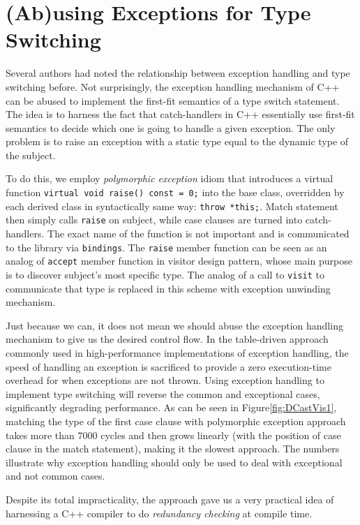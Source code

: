 \documentclass[preprint]{sigplanconf}
\makeatletter
\DeclareRobustCommand{\code}[1]{{\lstinline[breaklines=false,escapechar=@]{#1}}}
\makeatother
\begin{document}
\section{(Ab)using Exceptions for Type Switching}
\label{sec:xpm}

Several authors had noted the relationship between exception handling and type 
switching before\cite{Glew99,ML2000}. Not surprisingly, the exception handling 
mechanism of C++ can be abused to implement the first-fit semantics of a type 
switch statement. The idea is to harness the fact that catch-handlers in C++ 
essentially use first-fit semantics to decide which one is going to handle a 
given exception. The only problem is to raise an exception with a static type 
equal to the dynamic type of the subject.

To do this, we employ \emph{polymorphic exception} idiom\cite{PolyExcept} that 
introduces a virtual function \code{virtual void raise() const = 0;} into the 
base class, overridden by each derived class in syntactically same way: 
\code{throw *this;}. Match statement then simply calls \code{raise} on subject, 
while case clauses are turned into catch-handlers. The exact name of the 
function is not important and is communicated to the library via 
\code{bindings}. The \code{raise} member function can be seen as an analog of 
\code{accept} member function in visitor design pattern, whose main purpose is 
to discover subject's most specific type. The analog of a call to \code{visit} 
to communicate that type is replaced in this scheme with exception unwinding 
mechanism.

Just because we can, it does not mean we should abuse the exception handling 
mechanism to give us the desired control flow. In the table-driven approach 
commonly used in high-performance implementations of exception handling, the 
speed of handling an exception is sacrificed to provide a zero execution-time 
overhead for when exceptions are not thrown\cite{Schilling98}. Using exception 
handling to implement type switching will reverse the common and exceptional 
cases, significantly degrading performance. As can be seen in 
Figure\ref{fig:DCastVis1}, matching the type of the first case clause with 
polymorphic exception approach takes more than 7000 cycles and then grows 
linearly (with the position of case clause in the match statement), making it the 
slowest approach. The numbers illustrate why exception handling should only be 
used to deal with exceptional and not common cases.

Despite its total impracticality, the approach gave us a very practical idea of 
harnessing a C++ compiler to do \emph{redundancy checking} at compile time.
\end{document}
